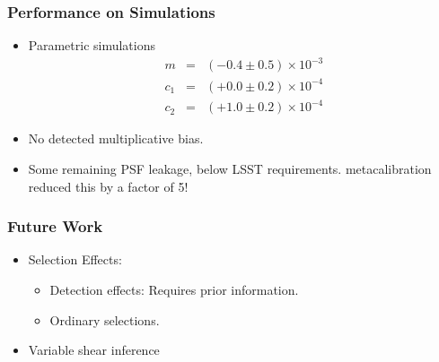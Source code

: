 \documentclass{beamer}
\newcommand{\mcal}{metacalibration}
\begin{document}
\frame
{
    \frametitle{Performance on Simulations}

 
    \begin{itemize}
            

         \item Parametric simulations
             {\color{gold} 
                 \begin{eqnarray}
                     m & = & (-0.4 \pm 0.5) \times 10^{-3} \nonumber \\
                   c_1 & = & (+0.0 \pm 0.2) \times 10^{-4} \nonumber \\
                   c_2 & = & (+1.0 \pm 0.2) \times 10^{-4} \nonumber
                 \end{eqnarray}
             }

         \item No detected multiplicative bias.
         \item Some remaining PSF leakage, below LSST requirements.  \mcal
             reduced this by a factor of 5!

    \end{itemize}

}

\frame
{
    \frametitle{Future Work}

 
    \begin{itemize}
            

         \item Selection Effects:
             \begin{itemize}
                 \item Detection effects:  Requires prior information.
                 \item Ordinary selections.  
             \end{itemize}

         \item Variable shear inference

    \end{itemize}

}
\end{document}
